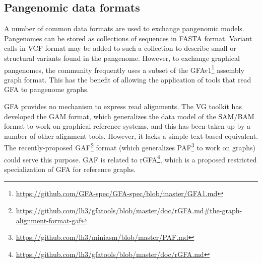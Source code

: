 
\subsection{Pangenomic data formats}

A number of common data formats are used to exchange pangenomic models.
Pangenomes can be stored as collections of sequences in FASTA format.
Variant calls in VCF format may be added to such a collection to describe small or structural variants found in the pangenome.
However, to exchange graphical pangenomes, the community frequently uses a subset of the GFAv1\footnote{\url{https://github.com/GFA-spec/GFA-spec/blob/master/GFA1.md}} assembly graph format.
This has the benefit of allowing the application of tools that read GFA to pangenome graphs.

GFA provides no mechanism to express read alignments.
The \textsc{VG} toolkit has developed the GAM format, which generalizes the data model of the SAM/BAM \cite{Li_2009} format to work on graphical reference systems, and this has been taken up by a number of other alignment tools.
However, it lacks a simple text-based equivalent.
The recently-proposed GAF\footnote{\url{https://github.com/lh3/gfatools/blob/master/doc/rGFA.md\#the-graph-alignment-format-gaf}} format (which generalizes PAF\footnote{\url{https://github.com/lh3/miniasm/blob/master/PAF.md}} to work on graphs) could serve this purpose.
GAF is related to rGFA\footnote{\url{https://github.com/lh3/gfatools/blob/master/doc/rGFA.md}}, which is a proposed restricted specialization of GFA for reference graphs.




